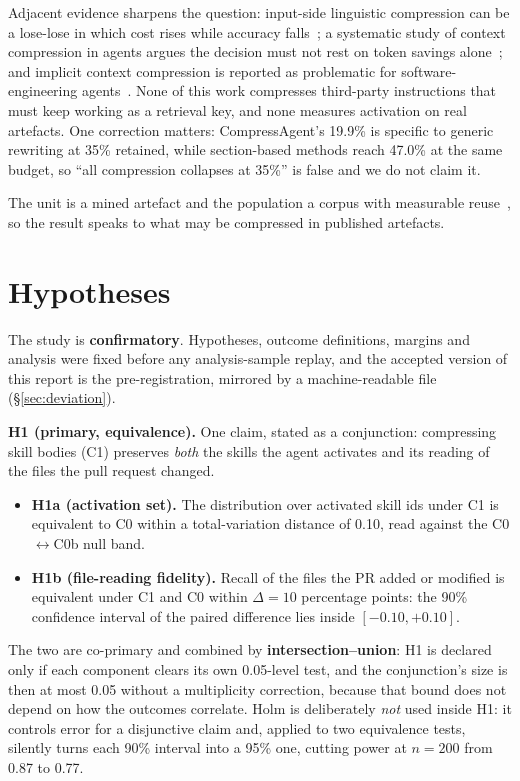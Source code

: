 \documentclass[10pt,conference]{IEEEtran}
\begin{document}
Adjacent evidence sharpens the question: input-side linguistic compression can be a lose-lose in which cost rises while accuracy falls~\cite{cavewoman}; a systematic study of context compression in agents argues the decision must not rest on token savings alone~\cite{beyondtokens}; and implicit context compression is reported as problematic for software-engineering agents~\cite{implicit}. None of this work compresses third-party instructions that must keep working as a retrieval key, and none measures activation on real artefacts. One correction matters: CompressAgent's 19.9\% is specific to generic rewriting at 35\% retained, while section-based methods reach 47.0\% at the same budget, so ``all compression collapses at 35\%'' is false and we do not claim it.

The unit is a mined artefact and the population a corpus with measurable reuse~\cite{skillsreuse}, so the result speaks to what may be compressed in published artefacts.

\section{Hypotheses}
\label{sec:hyp}
The study is \textbf{confirmatory}. Hypotheses, outcome definitions, margins and analysis were fixed before any analysis-sample replay, and the accepted version of this report is the pre-registration, mirrored by a machine-readable file (\S\ref{sec:deviation}).

\textbf{H1 (primary, equivalence).} One claim, stated as a conjunction: compressing skill bodies (C1) preserves \emph{both} the skills the agent activates and its reading of the files the pull request changed.
\begin{itemize}
\item \textbf{H1a (activation set).} The distribution over activated skill ids under C1 is equivalent to C0 within a total-variation distance of 0.10, read against the C0$\leftrightarrow$C0b null band.
\item \textbf{H1b (file-reading fidelity).} Recall of the files the PR added or modified is equivalent under C1 and C0 within $\Delta=10$ percentage points: the 90\% confidence interval of the paired difference lies inside $[-0.10,+0.10]$.
\end{itemize}
The two are co-primary and combined by \textbf{intersection--union}: H1 is declared only if each component clears its own 0.05-level test, and the conjunction's size is then at most 0.05 without a multiplicity correction, because that bound does not depend on how the outcomes correlate. Holm is deliberately \emph{not} used inside H1: it controls error for a disjunctive claim and, applied to two equivalence tests, silently turns each 90\% interval into a 95\% one, cutting power at $n=200$ from 0.87 to 0.77.
\end{document}
